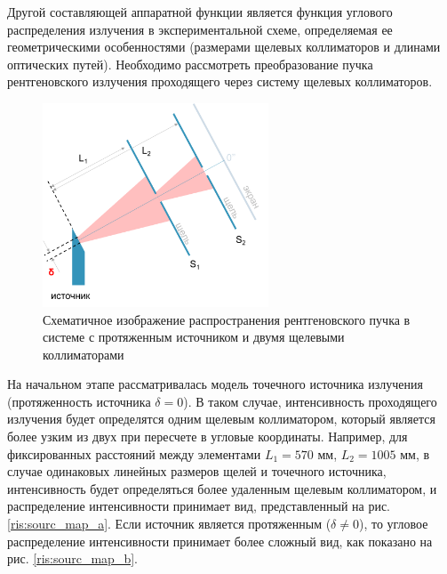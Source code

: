 \label{sec:slits_section}
Другой составляющей аппаратной функции является функция углового распределения излучения в
экспериментальной схеме, определяемая ее геометрическими особенностями (размерами щелевых
коллиматоров и длинами оптических путей). Необходимо рассмотреть преобразование пучка рентгеновского
 излучения проходящего через систему щелевых коллиматоров.
\begin{figure}[H]
  \centering
  \includegraphics[width=0.6\textwidth]{images/for_slits.png}
  \caption{Схематичное изображение распространения рентгеновского пучка в
  системе с протяженным источником и двумя щелевыми коллиматорами}
  \label{ris:for_slits}
\end{figure}

На начальном этапе рассматривалась модель точечного источника излучения
 (протяженность источника $\delta = 0$).
В таком случае, интенсивность проходящего излучения будет определятся
одним щелевым коллиматором, который является более узким из двух при пересчете в угловые
координаты. Например, для фиксированных расстояний между элементами $L_1 = 570$ мм, $L_2 = 1005$ мм,
 в случае одинаковых линейных размеров щелей и точечного
источника, интенсивность будет определяться более удаленным щелевым коллиматором, и
распределение интенсивности принимает вид, представленный на рис. \ref{ris:sourc_map_a}. Если источник является
протяженным ($\delta \neq 0$), то угловое распределение интенсивности принимает более сложный вид,
 как показано на рис. \ref{ris:sourc_map_b}.


